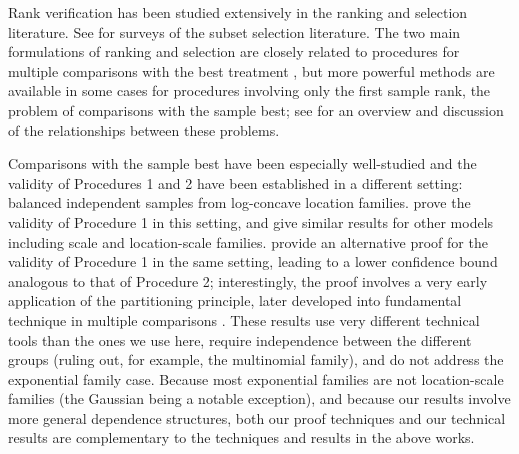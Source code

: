 \documentclass[aos, authoryear]{imsart}
\theoremstyle{definition}
\theoremstyle{custom}
\begin{document}
Rank verification has been studied extensively in the ranking and selection literature. See \citet{Gupta:1971wk, Gupta:1985bj} for surveys of the subset selection literature. The two main formulations of ranking and selection are closely related to procedures for multiple comparisons with the best treatment \citep{Edwards:1983eo,Hsu:1984gb},  but more powerful methods are available in some cases for procedures involving only the first sample rank, the problem of comparisons with the sample best; see \citet{Hsu:1996} for an overview and discussion of the relationships between these problems. 

Comparisons with the sample best have been especially well-studied and the validity of Procedures 1 and 2 have been established in a different setting: balanced independent samples from log-concave location families. \citet{Gutmann:1987fk} prove the validity of Procedure 1 in this setting, and \citet{Bofinger:1991hv,Maymin:1992fz, Karnnan:2009iv} give similar results for other models including scale and location-scale families. \citet{Stefansson:1988wj} provide an alternative proof for the validity of Procedure 1 in the same setting, leading to a lower confidence bound analogous to that of Procedure 2; interestingly, the proof involves a very early application of the partitioning principle, later developed into fundamental technique in multiple comparisons \citep{Finner:2002ju}. These results use very different technical tools than the ones we use here, require independence between the different groups (ruling out, for example, the multinomial family), and do not address the exponential family case. Because most exponential families are not location-scale families (the Gaussian being a notable exception), and because our results involve more general dependence structures, both our proof techniques and our technical results are complementary to the techniques and results in the above works.
\end{document}
